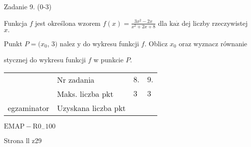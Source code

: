\documentclass[a4paper,12pt]{article}
\begin{document}
Zadanie 9. (0-3)

Funkcja $f$ jest określona wzorem $f(x)=\displaystyle \frac{3x^{2}-2x}{x^{2}+2x+8}$ dla $\mathrm{k}\mathrm{a}\dot{\mathrm{z}}$ dej liczby rzeczywistej $x.$

Punkt $P=(x_{0}$, 3$)$ nalez $\mathrm{y}$ do wykresu funkcji $f$. Oblicz $x_{0}$ oraz wyznacz równanie

stycznej do wykresu funkcji $f$ w punkcie $P.$
\begin{center}
\begin{tabular}{|l|l|l|l|}
\cline{2-4}
&	\multicolumn{1}{|l|}{Nr zadania}&	\multicolumn{1}{|l|}{$8.$}&	\multicolumn{1}{|l|}{ $9.$}	\\
\cline{2-4}
&	\multicolumn{1}{|l|}{Maks. liczba pkt}&	\multicolumn{1}{|l|}{$3$}&	\multicolumn{1}{|l|}{ $3$}	\\
\cline{2-4}
\multicolumn{1}{|l|}{egzaminator}&	\multicolumn{1}{|l|}{Uzyskana liczba pkt}&	\multicolumn{1}{|l|}{}&	\multicolumn{1}{|l|}{}	\\
\hline
\end{tabular}

\end{center}
$\mathrm{E}\mathrm{M}\mathrm{A}\mathrm{P}-\mathrm{R}0_{-}100$

Strona ll z29
\end{document}
